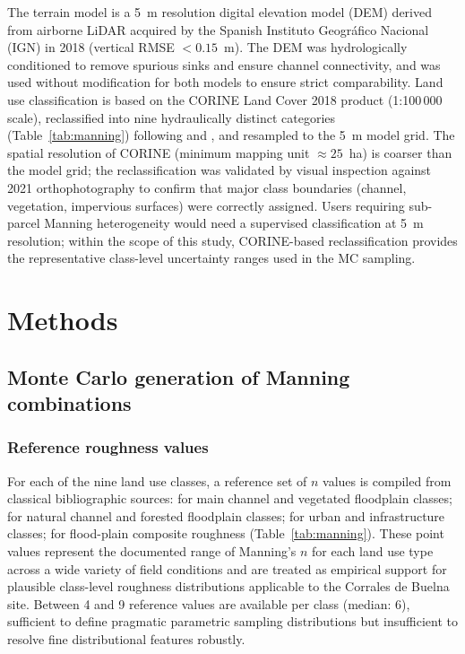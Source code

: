 \documentclass[review,12pt]{elsarticle}
\newcommand{\nman}{$n$}
\begin{document}
The terrain model is a 5~m resolution digital elevation model (DEM) derived
from airborne LiDAR acquired by the Spanish Instituto Geogr\'afico Nacional
(IGN) in 2018 (vertical RMSE $< 0.15$~m).
The DEM was hydrologically conditioned to remove spurious sinks and ensure
channel connectivity, and was used without modification for both models to
ensure strict comparability.
Land use classification is based on the CORINE Land Cover 2018 product
(1:100\,000 scale), reclassified into nine hydraulically distinct categories
(Table~\ref{tab:manning}) following \citet{chow1959} and \citet{fhwa1984},
and resampled to the 5~m model grid.
The spatial resolution of CORINE (minimum mapping unit $\approx 25$~ha) is
coarser than the model grid; the reclassification was validated by visual
inspection against 2021 orthophotography to confirm that major class boundaries
(channel, vegetation, impervious surfaces) were correctly assigned.
Users requiring sub-parcel Manning heterogeneity would need a supervised
classification at 5~m resolution; within the scope of this study,
CORINE-based reclassification provides the representative class-level
uncertainty ranges used in the MC sampling.

\section{Methods}
\label{sec:methods}

\subsection{Monte Carlo generation of Manning combinations}
\label{sec:mc}

\subsubsection{Reference roughness values}
For each of the nine land use classes, a reference set of \nman{} values is
compiled from classical bibliographic sources:
\citet{chow1959} for main channel and vegetated floodplain classes;
\citet{barnes1967} for natural channel and forested floodplain classes;
\citet{brater1996} for urban and infrastructure classes;
\citet{fhwa1984} for flood-plain composite roughness (Table~\ref{tab:manning}).
These point values represent the documented range of Manning's $n$ for each
land use type across a wide variety of field conditions and are treated as
empirical support for plausible class-level roughness distributions
applicable to the Corrales de Buelna site.
Between 4 and 9 reference values are available per class (median: 6),
sufficient to define pragmatic parametric sampling distributions but
insufficient to resolve fine distributional features robustly.
\end{document}

